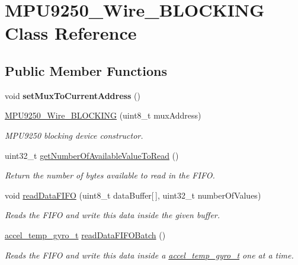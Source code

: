 \hypertarget{class_m_p_u9250___wire___b_l_o_c_k_i_n_g}{}\section{M\+P\+U9250\+\_\+\+Wire\+\_\+\+B\+L\+O\+C\+K\+I\+NG Class Reference}
\label{class_m_p_u9250___wire___b_l_o_c_k_i_n_g}
\subsection*{Public Member Functions}
\begin{DoxyCompactItemize}
\item 
\mbox{\label{class_m_p_u9250___wire___b_l_o_c_k_i_n_g_a5b9e5a0fe968d941c0bf81174bb087e0}} 
void {\bfseries set\+Mux\+To\+Current\+Address} ()
\item 
\hyperlink{class_m_p_u9250___wire___b_l_o_c_k_i_n_g_a998ae4c4645f79925e49d5a68511bfd5}{M\+P\+U9250\+\_\+\+Wire\+\_\+\+B\+L\+O\+C\+K\+I\+NG} (uint8\+\_\+t mux\+Address)
\begin{DoxyCompactList}\small\item\em M\+P\+U9250 blocking device constructor. \end{DoxyCompactList}\item 
uint32\+\_\+t \hyperlink{class_m_p_u9250___wire___b_l_o_c_k_i_n_g_a14dae485bfe34ee6ef25c9338fca2e6c}{get\+Number\+Of\+Available\+Value\+To\+Read} ()
\begin{DoxyCompactList}\small\item\em Return the number of bytes available to read in the F\+I\+FO. \end{DoxyCompactList}\item 
void \hyperlink{class_m_p_u9250___wire___b_l_o_c_k_i_n_g_a385ee7486440d79931a9d2e7c1c7321b}{read\+Data\+F\+I\+FO} (uint8\+\_\+t data\+Buffer\mbox{[}$\,$\mbox{]}, uint32\+\_\+t number\+Of\+Values)
\begin{DoxyCompactList}\small\item\em Reads the F\+I\+FO and write this data inside the given buffer. \end{DoxyCompactList}\item 
\hyperlink{unionaccel__temp__gyro__t}{accel\+\_\+temp\+\_\+gyro\+\_\+t} \hyperlink{class_m_p_u9250___wire___b_l_o_c_k_i_n_g_a800f7076178a747676b0094fd9e89a56}{read\+Data\+F\+I\+F\+O\+Batch} ()
\begin{DoxyCompactList}\small\item\em Reads the F\+I\+FO and write this data inside a \hyperlink{unionaccel__temp__gyro__t}{accel\+\_\+temp\+\_\+gyro\+\_\+t} one at a time. \end{DoxyCompactList}\item 

\end{DoxyCompactItemize}
